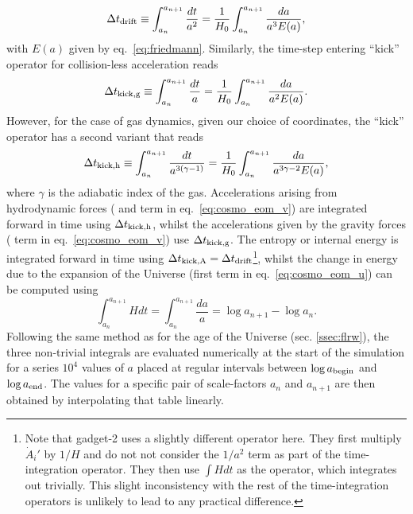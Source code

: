 \begin{equation}
  \Delta t_{\rm drift} \equiv \int_{a_n}^{a_{n+1}} \frac{dt}{a^2} = \frac{1}{H_0} \int_{a_n}^{a_{n+1}} \frac{da}{a^3E(a)},
\end{equation}
with $E(a)$ given by eq.~\ref{eq:friedmann}. Similarly, the time-step
entering ``kick'' operator for collision-less acceleration reads
\begin{equation}
  \Delta t_{\rm kick,g} \equiv \int_{a_n}^{a_{n+1}} \frac{dt}{a} = \frac{1}{H_0} \int_{a_n}^{a_{n+1}} \frac{da}{a^2E(a)}.
\end{equation}
However, for the case of gas dynamics, given our choice of
coordinates, the ``kick'' operator has a second variant that reads
\begin{equation}
  \Delta t_{\rm kick,h} \equiv \int_{a_n}^{a_{n+1}} \frac{dt}{a^{3(\gamma-1)}} = \frac{1}{H_0} \int_{a_n}^{a_{n+1}} \frac{da}{a^{3\gamma - 2}E(a)},
\end{equation}
where $\gamma$ is the adiabatic index of the gas.  Accelerations
arising from hydrodynamic forces ( and  term in
eq.~\ref{eq:cosmo_eom_v}) are integrated forward in time using $\Delta
t_{\rm kick,h}$, whilst the accelerations given by the gravity forces
( term in eq.~\ref{eq:cosmo_eom_v}) use $\Delta t_{\rm
  kick,g}$. The entropy or internal energy is integrated forward in
time using $\Delta t_{\rm kick,A} = \Delta t_{\rm
  drift}$\footnote{Note that {\sc gadget-2} uses a slightly different
  operator here. They first multiply $\dot{A}_i'$ by $1/H$ and do not
  not consider the $1/a^2$ term as part of the time-integration
  operator. They then use $\int H dt$ as the operator, which
  integrates out trivially. This slight inconsistency with the rest of
  the time-integration operators is unlikely to lead to any practical
  difference.}, whilst the change in energy due to the expansion of
the Universe (first term in eq.~\ref{eq:cosmo_eom_u}) can be computed
using
\begin{equation}
  \int_{a_n}^{a_{n+1}} H dt = \int_{a_n}^{a_{n+1}} \frac{da}{a} =
  \log{a_{n+1}} - \log{a_n}.
\end{equation}
Following the same method as for the age of the Universe
(sec. \ref{ssec:flrw}), the three non-trivial integrals are evaluated
numerically at the start of the simulation for a series $10^4$ values
of $a$ placed at regular intervals between $\log a_{\rm begin}$ and
$\log a_{\rm end}$. The values for a specific pair of scale-factors
$a_n$ and $a_{n+1}$ are then obtained by interpolating that table
linearly.


